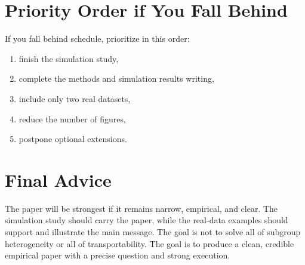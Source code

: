 \documentclass[11pt]{article}
\begin{document}
\section{Priority Order if You Fall Behind}
If you fall behind schedule, prioritize in this order:
\begin{enumerate}[label=(\arabic*)]
    \item finish the simulation study,
    \item complete the methods and simulation results writing,
    \item include only two real datasets,
    \item reduce the number of figures,
    \item postpone optional extensions.
\end{enumerate}

\section{Final Advice}
The paper will be strongest if it remains narrow, empirical, and clear. The simulation study should carry the paper, while the real-data examples should support and illustrate the main message. The goal is not to solve all of subgroup heterogeneity or all of transportability. The goal is to produce a clean, credible empirical paper with a precise question and strong execution.
\end{document}
